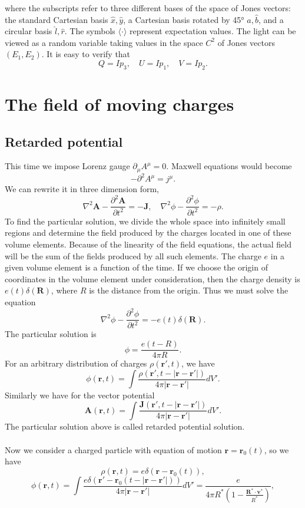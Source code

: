 where the subscripts refer to three different bases of the space of Jones vectors: the standard Cartesian basis ${\hat {x}},{\hat {y}}$, a Cartesian basis rotated by 45° ${\hat {a}},{\hat {b}}$, and a circular basis ${\hat {l}},{\hat {r}}$. The symbols $\langle \cdot \rangle$ represent expectation values. The light can be viewed as a random variable taking values in the space $C^2$ of Jones vectors $(E_1,E_2)$. It is easy to verify that
\[Q = Ip_3 , \quad U = Ip_1 , \quad V = Ip_2.\]

\section{The field of moving charges}
\subsection{Retarded potential}
This time we impose Lorenz gauge $\partial_{\mu} A^{\mu} = 0$. Maxwell equations would become
\[-\partial^2 A^{\mu} = j^{\mu}.\]
We can rewrite it in three dimension form,
\[\nabla^2 \bm{A} - \frac{\partial^2 \bm{A}}{\partial t^2} = -\bm{J} , \quad \nabla^2 \phi - \frac{\partial^2\phi}{\partial t^2} = -\rho.\]
To find the particular solution, we divide the whole space into infinitely small regions and determine the field produced by the charges located in one of these volume elements. Because of the linearity of the field equations, the actual field will be the sum of the fields produced by all such elements.
The charge $e$ in a given volume element is a function of the time. If we choose the origin of coordinates in the volume element under consideration, then the charge density is $e(t)\delta(\bm{R})$, where $R$ is the distance from the origin. Thus we must solve the equation
\[\nabla^2 \phi - \frac{\partial^2\phi}{\partial t^2} = -e(t)\delta(\bm{R}).\]
The particular solution is
\[\phi = \frac{e(t-R)}{4\pi R}.\]
For an arbitrary distribution of charges $\rho(\bm{r}',t)$, we have
\[\phi(\bm{r},t) = \int \frac{\rho(\bm{r}',t-|\bm{r}-\bm{r}'|)}{4\pi |\bm{r}-\bm{r}'|} dV'.\]
Similarly we have for the vector potential
\[\bm{A}(\bm{r},t) = \int \frac{\bm{J}(\bm{r}',t-|\bm{r}-\bm{r}'|)}{4\pi |\bm{r}-\bm{r}'|} dV'.\]
The particular solution above is called retarded potential solution.
\\ \\
Now we consider a charged particle with equation of motion $\bm{r} = \bm{r}_0(t)$, so we have
\[\rho(\bm{r},t) = e\delta(\bm{r}-\bm{r}_0(t)),\]
\[\phi(\bm{r},t) = \int \frac{e \delta (\bm{r}'-\bm{r}_0(t-|\bm{r}-\bm{r}'|))}{4\pi |\bm{r}-\bm{r}'|} dV' = \frac{e}{4\pi R^* (1 - \frac{\bm{R}^* \cdot \bm{v}^*}{R^*})},\]
